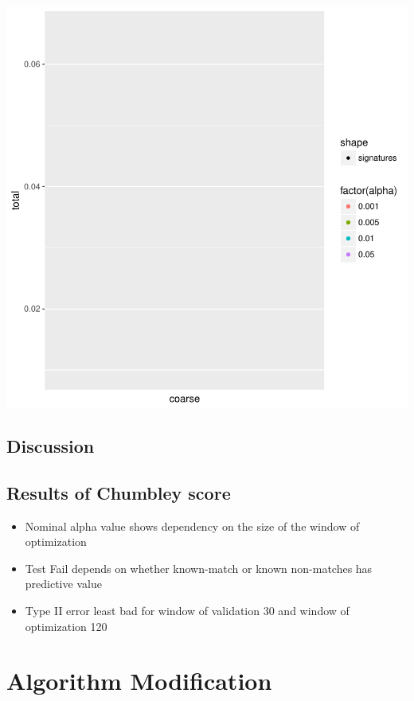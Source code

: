 \documentclass[12pt]{article}
\providecommand{\tightlist}{%
  \setlength{\itemsep}{0pt}\setlength{\parskip}{0pt}}
\begin{document}
\begin{center}\includegraphics[width=\textwidth]{figures/unnamed-chunk-7-1} \end{center}

\subsection{Discussion}\label{discussion}

\subsection{Results of Chumbley score}\label{results-of-chumbley-score}

\begin{itemize}
\tightlist
\item
  Nominal alpha value shows dependency on the size of the window of
  optimization
\item
  Test Fail depends on whether known-match or known non-matches has
  predictive value
\item
  Type II error least bad for window of validation 30 and window of
  optimization 120
\end{itemize}

\section{Algorithm Modification}\label{algorithm-modification}
\end{document}
